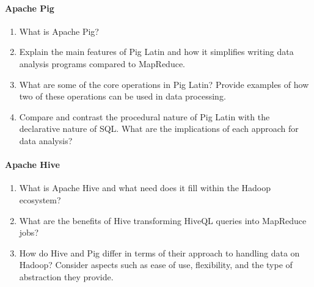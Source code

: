 \paragraph*{Apache Pig}
\begin{enumerate}
	\item What is Apache Pig?
	\item Explain the main features of Pig Latin and how it simplifies writing data analysis programs compared to MapReduce.
	\item What are some of the core operations in Pig Latin? Provide examples of how two of these operations can be used in data processing.
	\item Compare and contrast the procedural nature of Pig Latin with the declarative nature of SQL. What are the implications of each approach for data analysis?
\end{enumerate}
\paragraph*{Apache Hive}
\begin{enumerate}
	\item What is Apache Hive and what need does it fill within the Hadoop ecosystem?
	\item What are the benefits of Hive transforming HiveQL queries into MapReduce jobs?
	\item How do Hive and Pig differ in terms of their approach to handling data on Hadoop? Consider aspects such as ease of use, flexibility, and the type of abstraction they provide.
\end{enumerate}
